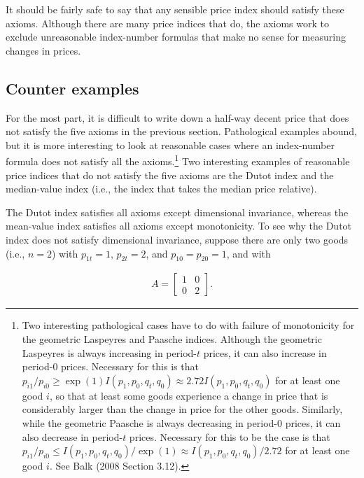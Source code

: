 \documentclass[]{article}
\begin{document}
It should be fairly safe to say that any sensible price index should satisfy these axioms. Although there are many price indices that do, the axioms work to exclude unreasonable index-number formulas that make no sense for measuring changes in prices.

\hypertarget{counter-examples}{%
\subsection{Counter examples}\label{counter-examples}}

For the most part, it is difficult to write down a half-way decent price that does not satisfy the five axioms in the previous section. Pathological examples abound, but it is more interesting to look at reasonable cases where an index-number formula does not satisfy all the axioms.\footnote{Two interesting pathological cases have to do with failure of monotonicity for the geometric Laspeyres and Paasche indices. Although the geometric Laspeyres is always increasing in period-\(t\) prices, it can also increase in period-0 prices. Necessary for this is that \(p_{i1} / p_{i0} \geq \exp(1) I(p_{1}, p_{0}, q_{t}, q_{0}) \approx 2.72 I(p_{1}, p_{0}, q_{t}, q_{0})\) for at least one good \(i\), so that at least some goods experience a change in price that is considerably larger than the change in price for the other goods. Similarly, while the geometric Paasche is always decreasing in period-0 prices, it can also decrease in period-\(t\) prices. Necessary for this to be the case is that \(p_{i1} / p_{i0} \leq I(p_{1}, p_{0}, q_{t}, q_{0}) / \exp(1) \approx I(p_{1}, p_{0}, q_{t}, q_{0}) / 2.72\) for at least one good \(i\). See Balk (2008 Section 3.12).} Two interesting examples of reasonable price indices that do not satisfy the five axioms are the Dutot index and the median-value index (i.e., the index that takes the median price relative).

The Dutot index satisfies all axioms except dimensional invariance, whereas the mean-value index satisfies all axioms except monotonicity. To see why the Dutot index does not satisfy dimensional invariance, suppose there are only two goods (i.e., \(n = 2\)) with \(p_{1t} = 1\), \(p_{2t} = 2\), and \(p_{10} = p_{20} = 1\), and with

\begin{align*}
A = 
\begin{bmatrix}
1 & 0 \\
0 & 2
\end{bmatrix}.
\end{align*}
\end{document}

